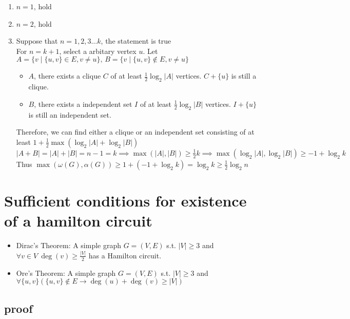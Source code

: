 \documentclass{article}
\begin{document}
\begin{enumerate}
	\item $n=1$, hold
	\item $n=2$, hold
	\item Suppose that $n=1,2,3\ldots k$, the statement is true\\
		For $n=k+1$, select a arbitary vertex $u$. 
		Let $A=\{v\mid \{u,v\}\in E,v\neq u\},\, B=\{v\mid \{u,v\}\not\in E,v\neq u\}$
		\begin{itemize}
			\item $A$, there exists a clique $C$ of at least $\frac{1}{2}\log_2 |A|$ vertices.
				$C+\{u\}$ is still a clique.
			\item $B$, there exists a independent set $I$ of at least $\frac{1}{2}\log_2 |B|$ vertices.
				$I+\{u\}$ is still an independent set.
		\end{itemize}
		Therefore, we can find either a clique or an independent set consisting of at least $1+\frac{1}{2}\max\left(\log_2 |A|+\log_2 |B|\right)$\\
		$|A+B|=|A|+|B|=n-1=k\implies \max(|A|,|B|)\geq \frac{1}{2}k\implies \max\left(\log_2 |A|,\log_2 |B|\right)\geq -1+\log_2 k$\\
		Thus $\max(\omega(G),\alpha(G))\geq 1+\left(-1+\log_2 k\right)=\log_2 k\geq \frac{1}{2}\log_2 n$
\end{enumerate}


\newpage
\section{Sufficient conditions for existence of a hamilton circuit }

\begin{itemize}
	\item Dirac's Theorem:
		A simple graph $G=(V,E)$ s.t. $|V|\geq 3$ and $\forall v\in V\ \deg(v)\geq \frac{|V|}{2}$ has a Hamilton circuit.
	\item Ore's Theorem: 
		A simple graph $G=(V,E)$ s.t. $|V|\geq 3$ and $\forall \{u,v\}\left( \{u,v\}\not\in E\rightarrow \deg(u)+\deg(v)\geq |V|\right)$
\end{itemize}

\subsection{proof}
\end{document}
